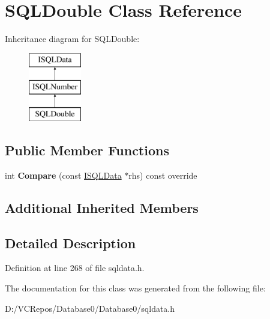 \hypertarget{class_s_q_l_double}{}\section{S\+Q\+L\+Double Class Reference}
\label{class_s_q_l_double}
Inheritance diagram for S\+Q\+L\+Double\+:\begin{figure}[H]
\begin{center}
\leavevmode
\includegraphics[height=3.000000cm]{class_s_q_l_double}
\end{center}
\end{figure}
\subsection*{Public Member Functions}
\begin{DoxyCompactItemize}
\item 
\mbox{\label{class_s_q_l_double_a63b130512f5d8685a0b3b2ccc0cc9071}} 
int {\bfseries Compare} (const \mbox{\hyperlink{class_i_s_q_l_data}{I\+S\+Q\+L\+Data}} $\ast$rhs) const override
\end{DoxyCompactItemize}
\subsection*{Additional Inherited Members}


\subsection{Detailed Description}


Definition at line 268 of file sqldata.\+h.



The documentation for this class was generated from the following file\+:\begin{DoxyCompactItemize}
\item 
D\+:/\+V\+C\+Repos/\+Database0/\+Database0/sqldata.\+h\end{DoxyCompactItemize}
